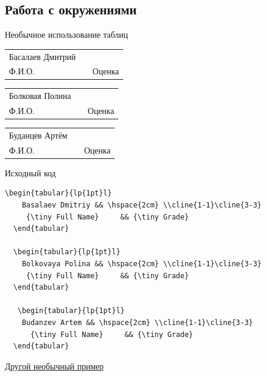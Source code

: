 \documentclass{beamer}[aspectratio=169]
\begin{document}
\subsection{Работа с окружениями}
\begin{frame}{Необычное использование таблиц}
\begin{center}
\begin{tabular}{lp{1pt}l} 
    Басалаев Дмитрий && \hspace{2cm} \\\cline{1-1}\cline{3-3} 
     {\tiny Ф.И.О.}     && {\tiny Оценка}
  \end{tabular}
  
  \begin{tabular}{lp{1pt}l} 
    Болковая Полина && \hspace{2cm} \\\cline{1-1}\cline{3-3} 
     {\tiny Ф.И.О.}     && {\tiny Оценка}
  \end{tabular}
  
   \begin{tabular}{lp{1pt}l} 
    Буданцев Артём && \hspace{2cm} \\\cline{1-1}\cline{3-3} 
      {\tiny Ф.И.О.}     && {\tiny Оценка} 
  \end{tabular}
\end{center}
\end{frame}




\begin{frame}[fragile]{Исходный код}
\begin{adjustbox}{scale=0.65}
\begin{large}
\transwipe

 \begin{lstlisting}[language=Tex]
  \begin{tabular}{lp{1pt}l} 
    Basalaev Dmitriy && \hspace{2cm} \\cline{1-1}\cline{3-3} 
     {\tiny Full Name}     && {\tiny Grade}
  \end{tabular}

  \begin{tabular}{lp{1pt}l} 
    Bolkovaya Polina && \hspace{2cm} \\cline{1-1}\cline{3-3} 
     {\tiny Full Name}     && {\tiny Grade}
  \end{tabular}

   \begin{tabular}{lp{1pt}l} 
    Budanzev Artem && \hspace{2cm} \\cline{1-1}\cline{3-3} 
      {\tiny Full Name}     && {\tiny Grade} 
  \end{tabular}

\end{lstlisting}
\end{large}
\end{adjustbox}

\hyperlink{d6}{Другой необычный пример}


\end{frame}
\end{document}
